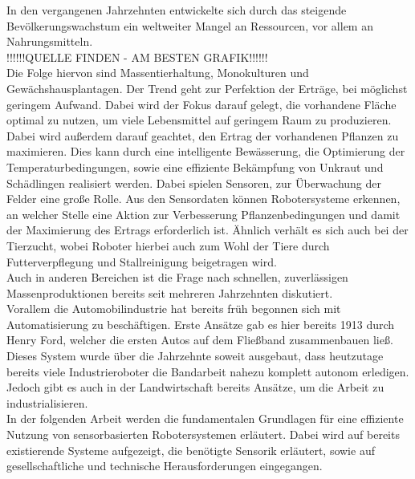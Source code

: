 In den vergangenen Jahrzehnten entwickelte sich durch das steigende
Bevölkerungswachstum ein weltweiter Mangel an Ressourcen, vor allem an
Nahrungsmitteln.\\!!!!!!QUELLE FINDEN - AM BESTEN GRAFIK!!!!!!\\ Die Folge
hiervon sind Massentierhaltung, Monokulturen und Gewächshausplantagen. Der
Trend geht zur Perfektion der Erträge, bei möglichst geringem Aufwand. Dabei
wird der Fokus darauf gelegt, die vorhandene Fläche optimal zu nutzen, um viele
Lebensmittel auf geringem Raum zu produzieren. Dabei wird außerdem darauf
geachtet, den Ertrag der vorhandenen Pflanzen zu maximieren. Dies kann durch
eine intelligente Bewässerung, die Optimierung der Temperaturbedingungen, sowie
eine effiziente Bekämpfung von Unkraut und Schädlingen realisiert werden. Dabei
spielen Sensoren, zur Überwachung der Felder eine große Rolle. Aus den
Sensordaten können Robotersysteme erkennen, an welcher Stelle eine Aktion zur
Verbesserung Pflanzenbedingungen und damit der Maximierung des Ertrags
erforderlich ist. Ähnlich verhält es sich auch bei der Tierzucht, wobei Roboter
hierbei auch zum Wohl der Tiere durch Futterverpflegung und Stallreinigung
beigetragen wird. \\Auch in anderen Bereichen ist die Frage nach schnellen,
zuverlässigen Massenproduktionen bereits seit mehreren Jahrzehnten diskutiert.
\\Vorallem die Automobilindustrie hat bereits früh begonnen sich mit
Automatisierung zu beschäftigen. Erste Ansätze gab es hier bereits 1913 durch
Henry Ford, welcher die ersten Autos auf dem Fließband zusammenbauen ließ.
Dieses System wurde über die Jahrzehnte soweit ausgebaut, dass heutzutage
bereits viele Industrieroboter die Bandarbeit nahezu komplett autonom
erledigen. \\Jedoch gibt es auch in der Landwirtschaft bereits Ansätze, um die
Arbeit zu industrialisieren. \\In der folgenden Arbeit werden die fundamentalen
Grundlagen für eine effiziente Nutzung von sensorbasierten Robotersystemen
erläutert. Dabei wird auf bereits existierende Systeme aufgezeigt, die
benötigte Sensorik erläutert, sowie auf gesellschaftliche und technische
Herausforderungen eingegangen.